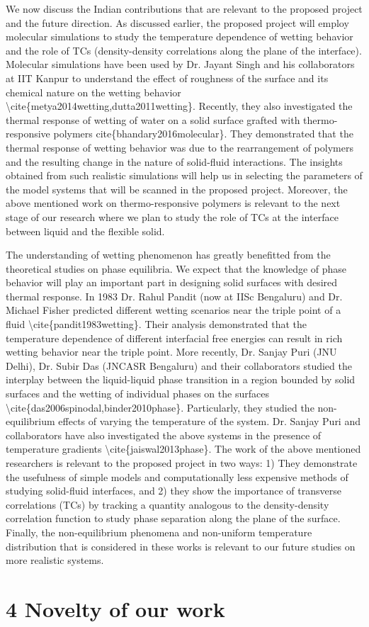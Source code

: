 \par We now discuss the Indian contributions that are relevant to the proposed project and the future direction. As discussed earlier, the proposed project will employ molecular simulations to study the temperature dependence of wetting behavior and the role of TCs (density-density correlations along the plane of the interface). Molecular simulations have been used  by Dr. Jayant Singh and his collaborators at IIT Kanpur to understand the effect of roughness of the surface and its chemical nature on the wetting behavior \textbackslash cite\{metya2014wetting,dutta2011wetting\}. Recently, they also investigated the thermal response of wetting of water on a solid surface grafted with thermo-responsive polymers cite\{bhandary2016molecular\}. They demonstrated that the thermal response of wetting behavior was due to the rearrangement of polymers and the resulting change in the nature of solid-fluid interactions. The insights obtained from such realistic simulations will help us in selecting the parameters of the model systems that will be scanned in the proposed project. Moreover, the above mentioned work on thermo-responsive polymers is relevant to the next stage of our research where we plan to study the role of TCs at the interface between liquid and the flexible solid.
\par The understanding of wetting phenomenon has greatly benefitted from the theoretical studies on phase equilibria. We expect that the knowledge of phase behavior will play an important part in designing solid surfaces with desired thermal response. In 1983 Dr. Rahul Pandit (now at IISc Bengaluru) and Dr. Michael Fisher predicted different wetting scenarios near the triple point of a fluid \textbackslash cite\{pandit1983wetting\}. Their analysis demonstrated that the temperature dependence of different interfacial free energies can result in rich wetting behavior near the triple point. More recently, Dr. Sanjay Puri (JNU Delhi), Dr. Subir Das (JNCASR Bengaluru) and their collaborators studied the interplay between the liquid-liquid phase transition in a region bounded by solid surfaces and the wetting of individual phases on the surfaces \textbackslash cite\{das2006spinodal,binder2010phase\}. Particularly, they studied the non-equilibrium effects of varying the temperature of the system. Dr. Sanjay Puri and collaborators have also investigated the above systems in the presence of temperature gradients \textbackslash cite\{jaiswal2013phase\}.  The work of the above mentioned researchers is relevant to the proposed project in two ways: 1) They demonstrate the usefulness of simple models and computationally less expensive methods of studying solid-fluid interfaces, and 2) they show the importance of transverse correlations (TCs) by tracking a quantity analogous to the density-density correlation function to study phase separation along the plane of the surface. Finally, the non-equilibrium phenomena and non-uniform temperature distribution that is considered in these works is relevant to our future studies on more realistic systems.\section{4 Novelty of our work}
